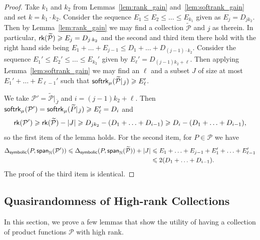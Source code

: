\documentclass[11pt]{article}
\newcommand\card[1]{\left| {#1} \right|}
\newcommand\spn{{\sf span}_{\mathbb{N}}}
\renewcommand\geq{\geqslant}
\renewcommand\leq{\leqslant}
\begin{document}
    \begin{proof}
        Take $k_1$ and $k_2$ from Lemmas~\ref{lem:rank_gain} and~\ref{lem:softrank_gain} and set $k=k_1\cdot k_2$. Consider the sequence $E_1\leq E_2\leq\ldots\leq E_{k_1}$ given as $E_j = D_{j k_2}$. Then by Lemma~\ref{lem:rank_gain} we may find a collection $\widetilde{\mathcal{P}}$ and $j$ as therein. In particular, 
        ${\sf rk}(\widetilde{\mathcal{P}})\geq E_j = D_{j\cdot k_2}$ and 
        the second and third item there hold with the right hand side being $E_1+\ldots+E_{j-1}\leq D_1+\ldots+D_{(j-1)\cdot k_2}$. Consider the sequence $E_1'\leq E_2'\leq\ldots\leq E_{k_2}'$ given by $E_\ell' = D_{(j-1)k_2+\ell}$. Then applying Lemma~\ref{lem:softrank_gain} we may find an $\ell$ and a subset $J$ of size at most $E_1'+\ldots + E_{\ell-1}'$ such that ${\sf softrk}_{\mu}(\widetilde{\mathcal{P}}|_{\bar{J}})\geq E_{\ell}'$. 
        
        We take $\mathcal{P}' = \widetilde{\mathcal{P}}|_{\bar{J}}$ and $i=(j-1)k_2+\ell$. Then ${\sf softrk}_{\mu}(\mathcal{P}') = {\sf softrk}_{\mu}(\widetilde{P}|_{\bar{J}})\geq E_{\ell}' = D_{i}$ and 
        \[
        {\sf rk}(\mathcal{P}')
        \geq 
        {\sf rk}(\widetilde{\mathcal{P}})-\card{J}
        \geq D_{j k_2}
        -
        (D_1+\ldots+D_{i-1})
        \geq D_i-
        (D_1+\ldots+D_{i-1}),
        \]
        so the first item of the lemma holds. For the second item, for $P\in\mathcal{P}$ we have
        \begin{align*}
        \Delta_{{\sf symbolic}}(P,\spn(\mathcal{P}'))
        \leq 
        \Delta_{{\sf symbolic}}(P,\spn(\widetilde{\mathcal{P}}))+\card{J}
        &\leq E_1+\ldots+E_{j-1}+E_1'+\ldots+E_{\ell-1}'\\
        &\leq 
        2(D_1+\ldots+D_{i-1}).
        \end{align*}
        The proof of the third item is identical.
    \end{proof}
    
    \subsection{Quasirandomness of High-rank Collections}\label{sec:quasirandom_props}
In this section, we prove a few lemmas that show the utility of having a collection of product functions $\mathcal{P}$ with high rank.
\end{document}
